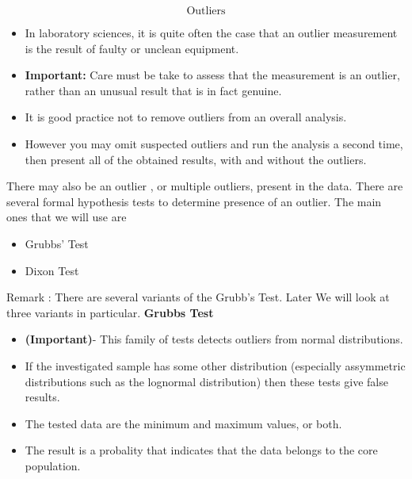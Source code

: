 \documentclass[a4paper,12pt]{article}
\begin{document}
	\LARGE
	\[ \mbox{Outliers} \]
	
	\Large
	\begin{itemize}
		\item In laboratory sciences, it is quite often the case that an outlier measurement is the result of faulty or unclean equipment. 
		\item \textbf{Important:} Care must be take to assess that the measurement is an outlier, rather than an unusual result that is in fact genuine.
		\item It is good practice not to remove outliers from an overall analysis. 
		\item However you may omit suspected outliers and run the analysis a second time, then present all of the obtained results, with and without the outliers.
	\end{itemize}

\Large


There may also be an outlier , or multiple outliers, present in the data. There are several formal  hypothesis tests to determine presence of an outlier. The main ones that we will use are

\begin{itemize}
	\item Grubbs' Test
	\item Dixon Test
\end{itemize}
\bigskip
Remark : There are several variants of the Grubb's Test. Later We will look at three variants in particular.
\Large
\textbf{Grubbs Test }


\begin{itemize}
	\item 
	\textbf{(Important)}- This family of tests detects outliers from normal distributions. 
	\bigskip
	\item If the investigated sample has some other distribution (especially
	assymmetric distributions such as the lognormal distribution) then these tests give false results.\bigskip
	
	\item The tested data are the
	minimum and maximum values, or both.  \bigskip
	\item The result is a probality that indicates that the data
	belongs to the core population.
\end{itemize}
\end{document}

